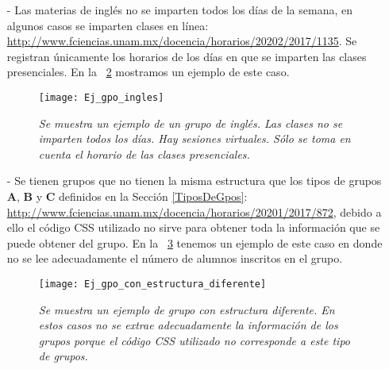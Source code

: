 \begin{itemize}
En la \figurename{~\ref{horariosMultiples}} tenemos un ejemplo de este caso en donde el profesor imparte su clase los lunes, miércoles y viernes de 13-14hrs en el salón O215, hay una ayudantía los martes y jueves de 13-14hrs en el salón O215 y otra ayudantía los martes de 11-13hrs en el salón 304 (Yelizcalli). Se considera que esta materia inicia a las 13hrs y se imparte en el salón O215.

\begin{figure}[H]
\centering
\texttt{[image: Ej\_gpo\_horarios\_multiples]} %
\caption[\textit{Ejemplo de grupo con horarios múltiples}]{\textit{Se muestra un ejemplo de grupo con horarios múltiples. En estos grupos sólo se toman en cuenta los horarios y salones en los que los profesores imparten clase.}}\label{horariosMultiples}
\end{figure}

\item[-] Las materias de inglés no se imparten todos los días de la semana, en algunos casos se imparten clases en línea: \url{http://www.fciencias.unam.mx/docencia/horarios/20202/2017/1135}. Se registran únicamente los horarios de los días en que se imparten las clases presenciales. En la \figurename{~\ref{casoIngles}} mostramos un ejemplo de este caso.

\begin{figure}[H]
\centering
\texttt{[image: Ej\_gpo\_ingles]} %
\caption[\textit{Ejemplo de grupo de inglés}]{\textit{Se muestra un ejemplo de un grupo de inglés. Las clases no se imparten todos los días. Hay sesiones virtuales. Sólo se toma en cuenta el horario de las clases presenciales.}}\label{casoIngles}
\end{figure}

\item[-] Se tienen grupos que no tienen la misma estructura que los tipos de grupos \textbf{A}, \textbf{B} y \textbf{C} definidos en la Sección \ref{TiposDeGpos}: \url{http://www.fciencias.unam.mx/docencia/horarios/20201/2017/872}, debido a ello el código CSS utilizado no sirve para obtener toda la información que se puede obtener del grupo. En la \figurename{~\ref{GpoEstructuraDiferente}} tenemos un ejemplo de este caso en donde no se lee adecuadamente el número de alumnos inscritos en el grupo.

\begin{figure}[H]
\centering
\texttt{[image: Ej\_gpo\_con\_estructura\_diferente]} %
\caption[\textit{Ejemplo de grupo con estructura diferente}]{\textit{Se muestra un ejemplo de grupo con estructura diferente. En estos casos no se extrae adecuadamente la información de los grupos porque el código CSS utilizado no corresponde a este tipo de grupos.}}\label{GpoEstructuraDiferente}
\end{figure}

\end{itemize}